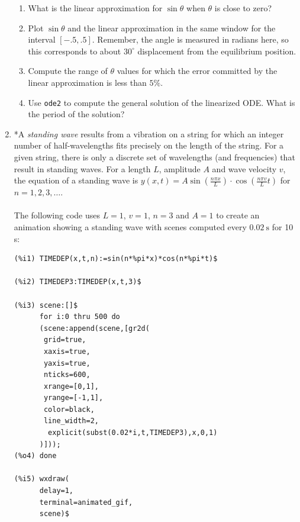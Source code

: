 \documentclass[10.5pt,twoside]{report}
\theoremstyle{definition}
\begin{document}
\begin{enumerate}
 \begin{enumerate}
  
 \item What is the linear approximation for $\sin{\theta}$ when $\theta$ is close to zero?
 
 \item Plot $\sin{\theta}$ and the linear approximation in the same window for the interval $[-.5,.5]$.   Remember, the angle is measured in radians here, so this corresponds to about $30^{\circ}$ displacement from the equilibrium position.
 
 \item Compute the range of $\theta$ values for which the error committed by the linear approximation is less than $5 \%$.
 
 \item Use \verb|ode2| to compute the general solution of the linearized ODE.  What is the period of the solution?
 
 \end{enumerate}



\item *A \textit{standing wave} results from a vibration on a string for which an integer number of half-wavelengths fits precisely on the length of the string.  For a given string, there is only a discrete set of wavelengths (and frequencies) that result in standing waves.  For a length $L$, amplitude $A$ and wave velocity $v$, the equation of a standing wave is $y(x,t)=A\sin \left(\frac{n\pi x}{L} \right)\cdot \cos \left(\frac{n\pi v}{L} t\right)$ for $n=1,2,3,\dots$.\\
${}$\\
The following code uses $L=1$, $v=1$, $n=3$ and $A=1$ to create an animation showing a standing wave with scenes computed every $0.02\ \mathrm{s}$ for 10 s:

\begin{verbatim}
(%i1) TIMEDEP(x,t,n):=sin(n*%pi*x)*cos(n*%pi*t)$

(%i2) TIMEDEP3:TIMEDEP(x,t,3)$

(%i3) scene:[]$
      for i:0 thru 500 do
      (scene:append(scene,[gr2d(
       grid=true,
       xaxis=true,
       yaxis=true,
       nticks=600,
       xrange=[0,1],
       yrange=[-1,1],
       color=black,
       line_width=2,
        explicit(subst(0.02*i,t,TIMEDEP3),x,0,1)
      )]));
(%o4) done

(%i5) wxdraw(
      delay=1,
      terminal=animated_gif,
      scene)$
\end{verbatim}


\end{enumerate}
\end{document}
